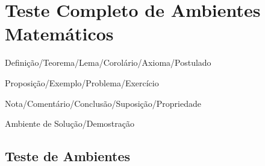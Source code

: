 \documentclass[pt]{../../elegantbook}
\begin{document}
\chapter{Teste Completo de Ambientes Matemáticos}
\begin{introduction}
\item Definição/Teorema/Lema/Corolário/Axioma/Postulado
\item Proposição/Exemplo/Problema/Exercício
\item Nota/Comentário/Conclusão/Suposição/Propriedade
\item Ambiente de Solução/Demostração
\end{introduction}

\section{Teste de Ambientes}
\end{document}
